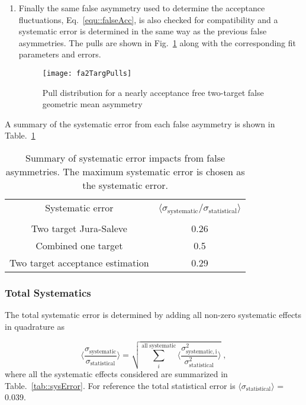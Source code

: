 \begin{enumerate}
\item Finally the same false asymmetry used to determine the acceptance
  fluctuations, Eq.~\ref{equ::falseAcc}, is also checked for compatibility and a
  systematic error is determined in the same way as the previous false
  asymmetries.  The pulls are shown in Fig.~\ref{fig::fa2TargPulls} along with
  the corresponding fit parameters and errors.

  \begin{figure}[h!t]
    \centering \texttt{[image: fa2TargPulls]}
    \caption{Pull distribution for a nearly acceptance free two-target false
      geometric mean asymmetry}
    \label{fig::fa2TargPulls}
  \end{figure}
  
\end{enumerate}

A summary of the systematic error from each false asymmetry is shown in
Table.~\ref{tab::faSys}

\begin{table}[h!t]
  \centering
  \begin{tabular}{|c|c|}
    \hline Systematic error& \multirow{2}{9em}{$\langle
      \sigma_{\mathrm{systematic}}/\sigma_{\mathrm{statistical}}
      \rangle$}\\ & \\ \hline
    
    Two target Jura-Saleve& 0.26\\ \hline

    Combined one target& 0.5\\ \hline

    Two target acceptance estimation& 0.29\\ \hline
    
  \end{tabular}
  \caption{Summary of systematic error impacts from false asymmetries.  The
    maximum systematic error is chosen as the systematic error.}
  \label{tab::faSys}
\end{table}

\subsubsection{Total Systematics}
The total systematic error is determined by adding all non-zero systematic
effects in quadrature as

\begin{equation}
  \Big \langle \frac{
    \sigma_{\mathrm{systematic}}}{\sigma_{\mathrm{statistical}}} \Big \rangle =
  \sqrt{ \sum_i^{\mathrm{all \; systematic}} \Big \langle
    \frac{\sigma^2_{\mathrm{systematic, i}}}{\sigma^2_{\mathrm{statistical}}}
    \Big \rangle } \;,
\end{equation}
where all the systematic effects considered are summarized in
Table.~\ref{tab::sysError}.  For reference the total statistical error is
$\langle \sigma_{\mathrm{statistical}} \rangle$ = 0.039.

